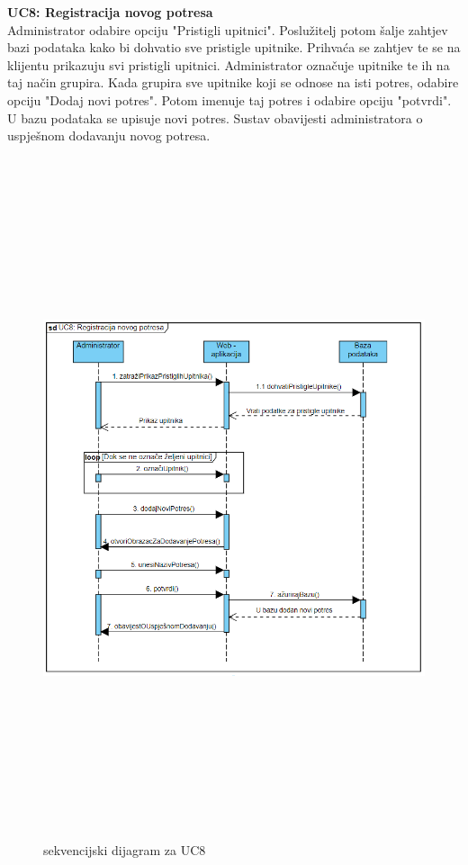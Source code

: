			\textbf{UC8: Registracija novog potresa}\\
			{Administrator odabire opciju "Pristigli upitnici". Poslužitelj potom šalje zahtjev bazi podataka kako bi dohvatio sve pristigle upitnike. Prihvaća se zahtjev te se na klijentu prikazuju svi pristigli upitnici. Administrator označuje upitnike te ih na taj način grupira. Kada grupira sve upitnike koji se odnose na isti potres, odabire opciju "Dodaj novi potres". Potom imenuje taj potres i odabire opciju "potvrdi". U bazu podataka se upisuje novi potres. Sustav obavijesti administratora o uspješnom dodavanju novog potresa.}
			\begin{figure}[H]
				  \includegraphics[width=\textwidth, height=20cm]{slike/uc8.PNG}
				  \caption{sekvencijski dijagram za UC8}
				  \label{fig:sekvuc4} 
				 \end{figure}
			 
